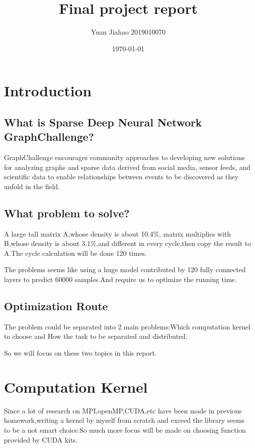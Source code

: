 \documentclass[12pt]{scrartcl} %
\title{	
	Final project report
}
\author{Yuan Jiahao 2019010070} %
\date{\normalsize\today} %
\begin{document}
\maketitle %
\tableofcontents
\newpage

\section{Introduction}
\subsection{What is Sparse Deep Neural Network GraphChallenge?}
GraphChallenge encourages community approaches to developing new solutions for analyzing graphs and sparse data derived from social media, sensor feeds, and scientific data to enable relationships between events to be discovered as they unfold in the field.
\subsection{What problem to solve?}
A large tall matrix A,whose density is about 10.4\%, matrix multiplies with B,whose density is about 3.1\%,and different in every cycle,then copy the result to A.The cycle calculation will be done 120 times.

The problems seems like using a huge model contributed by 120 fully connected layers to predict 60000 samples.And require us to optimize the running time.
\subsection{Optimization Route}
The problem could be separated into 2 main problems:Which computation kernel to choose and How the task to be separated and distributed.

So we will focus on these two topics in this report.
\section{Computation Kernel}
Since a lot of research on MPI,openMP,CUDA,etc have been made in previous homework,writing a kernel by myself from scratch and exceed the library seems to be a not smart choice.So much more focus will be made on choosing function provided by CUDA kits.
\end{document}
